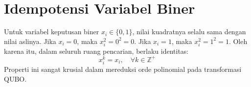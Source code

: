 \section{Idempotensi Variabel Biner}
Untuk variabel keputusan biner $x_i \in \{0, 1\}$, nilai kuadratnya selalu sama dengan nilai aslinya.
Jika $x_i = 0$, maka $x_i^2 = 0^2 = 0$.
Jika $x_i = 1$, maka $x_i^2 = 1^2 = 1$.
Oleh karena itu, dalam seluruh ruang pencarian, berlaku identitas:
\begin{equation}
x_i^k = x_i, \quad \forall k \in \mathbb{Z}^+
\end{equation}
Properti ini sangat krusial dalam mereduksi orde polinomial pada transformasi QUBO.
